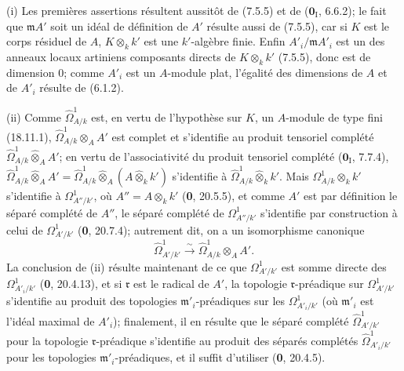 
(i) Les premières assertions résultent aussitôt de (7.5.5) et de ($\mathbf{0}_{\mathrm I}$, 6.6.2); le fait que $\mathfrak mA'$ soit un idéal de définition de $A'$ résulte aussi de (7.5.5), car si $K$ est le corps résiduel de $A$, $K\otimes_k k'$ est une $k'$-algèbre finie. Enfin $A'_i/\mathfrak mA'_i$ est un des anneaux locaux artiniens composants directs de $K\otimes_k k'$ (7.5.5), donc est de dimension 0; comme $A'_i$ est un $A$-module plat, l'égalité des dimensions de $A$ et de $A'_i$ résulte de (6.1.2).

(ii) Comme $\hat{\Omega}^1_{A/k}$ est, en vertu de l'hypothèse sur $K$, un $A$-module de type fini (18.11.1), $\hat{\Omega}^1_{A/k}\otimes_A A'$ est complet et s'identifie au produit tensoriel complété $\hat{\Omega}^1_{A/k}\widehat{\otimes}_A A'$; en vertu de l'associativité du produit tensoriel complété ($\mathbf{0}_{\mathrm I}$, 7.7.4), $\hat{\Omega}^1_{A/k}\widehat{\otimes}_A A'=\hat{\Omega}^1_{A/k}\widehat{\otimes}_A(A\widehat{\otimes}_k k')$ s'identifie à $\hat{\Omega}^1_{A/k}\widehat{\otimes}_k k'$. Mais $\Omega^1_{A/k}\otimes_k k'$ s'identifie à $\Omega^1_{A''/k'}$, où $A''=A\otimes_k k'$ (\textbf{0}, 20.5.5), et comme $A'$ est par définition le séparé complété de $A''$, le séparé complété de $\Omega^1_{A''/k'}$ s'identifie par construction à celui de $\Omega^1_{A'/k'}$ (\textbf{0}, 20.7.4); autrement dit, on a un isomorphisme canonique
\[
  \hat{\Omega}^1_{A'/k'}\xrightarrow{\sim}\hat{\Omega}^1_{A/k}\otimes_A A'.
\]
La conclusion de (ii) résulte maintenant de ce que $\Omega^1_{A'/k'}$ est somme directe des $\Omega^1_{A'_i/k'}$ (\textbf{0}, 20.4.13), et si $\mathfrak r$ est le radical de $A'$, la topologie $\mathfrak r$-préadique sur $\Omega^1_{A'/k'}$ s'identifie au produit des topologies $\mathfrak m'_i$-préadiques sur les $\Omega^1_{A'_i/k'}$ (où $\mathfrak m'_i$ est l'idéal maximal de $A'_i$); finalement, il en résulte que le séparé complété $\hat{\Omega}^1_{A'/k'}$ pour la topologie $\mathfrak r$-préadique s'identifie au produit des séparés complétés $\hat{\Omega}^1_{A'_i/k'}$ pour les topologies $\mathfrak m'_i$-préadiques, et il suffit d'utiliser (\textbf{0}, 20.4.5).

